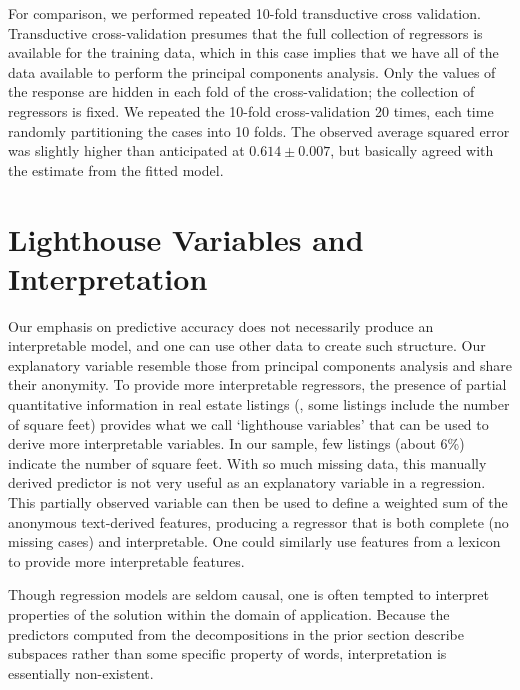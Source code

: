 \documentclass[12pt]{article}
\begin{document}
For comparison, we performed repeated 10-fold transductive cross validation.  Transductive cross-validation presumes that the full collection of regressors is available for the training data, which in this case implies that we have all of the data available to perform the principal components analysis.  Only the values of the response are hidden in each fold of the cross-validation; the collection of regressors is fixed.  We repeated the 10-fold cross-validation 20 times, each time randomly partitioning the cases into 10 folds. The observed average squared error was slightly higher than anticipated at $0.614 \pm 0.007$, but basically agreed with the estimate from the fitted model. 


\section{Lighthouse Variables and Interpretation}
\label{sec:light}
 
 

 Our emphasis on predictive accuracy does not necessarily produce an
 interpretable model, and one can use other data to create such structure.  Our
 explanatory variable resemble those from principal components analysis and
 share their anonymity.  To provide more interpretable regressors, the presence
 of partial quantitative information in real estate listings (\eg, some listings
 include the number of square feet) provides what we call ‘lighthouse variables’
 that can be used to derive more interpretable variables.  In our sample, few
 listings (about 6\%) indicate the number of square feet.  With so much missing
 data, this manually derived predictor is not very useful as an explanatory
 variable in a regression.  This partially observed variable can then be used to
 define a weighted sum of the anonymous text-derived features, producing a
 regressor that is both complete (no missing cases) and interpretable.  One
 could similarly use features from a lexicon to provide more interpretable
 features.


Though regression models are seldom causal, one is often tempted to interpret
 properties of the solution within the domain of application.  Because the
 predictors computed from the decompositions in the prior section describe
 subspaces rather than some specific property of words, interpretation is
 essentially non-existent.
\end{document}
